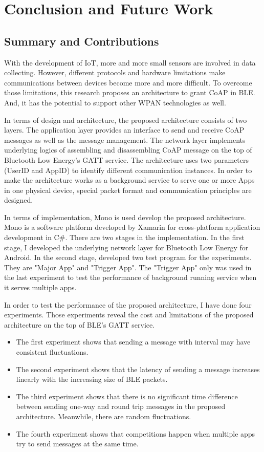 \documentclass{Nan_Thesis}
\begin{document}
\chapter{Conclusion and Future Work}
\section{Summary and Contributions}
With the development of IoT, more and more small sensors are involved in data collecting. However, different protocols and hardware limitations make communications between devices become more and more difficult. To overcome those limitations, this research proposes an architecture to grant CoAP in BLE. And, it has the potential to support other WPAN technologies as well.

In terms of design and architecture, the proposed architecture consists of two layers. The application layer provides an interface to send and receive CoAP messages as well as the message management. The network layer implements underlying logics of assembling and disassembling CoAP message on the top of Bluetooth Low Energy’s GATT service. The architecture uses two parameters (UserID and AppID) to identify different communication instances. In order to make the architecture works as a background service to serve one or more Apps in one physical device, special packet format and communication principles are designed.

In terms of implementation, Mono is used develop the proposed architecture. Mono is a software platform developed by Xamarin for cross-platform application development in C\#. There are two stages in the implementation. In the first stage, I developed the underlying network layer for Bluetooth Low Energy for Android. In the second stage, developed two test program for the experiments. They are "Major App" and "Trigger App". The "Trigger App" only was used in the last experiment to test the performance of background running service when it serves multiple apps.

In order to test the performance of the proposed architecture, I have done four experiments. Those experiments reveal the cost and limitations of the proposed architecture on the top of BLE’s GATT service.

\begin{itemize}
  \item The first experiment shows that sending a message with interval may have consistent fluctuations.
  \item The second experiment shows that the latency of sending a message increases linearly with the increasing size of BLE packets. 
  \item The third experiment shows that there is no significant time difference between sending one-way and round trip messages in the proposed architecture. Meanwhile, there are random fluctuations. 
  \item The fourth experiment shows that competitions happen when multiple apps try to send messages at the same time.  
\end{itemize}
\end{document}
